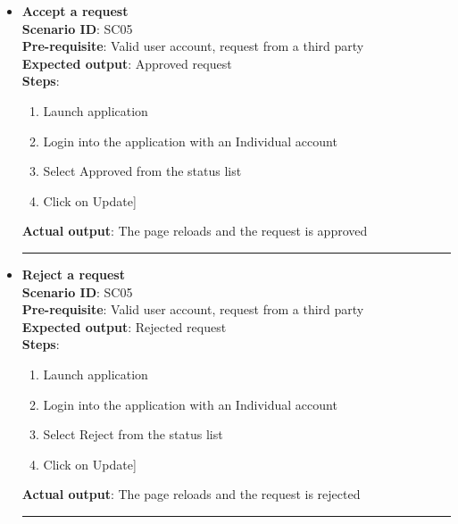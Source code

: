 \documentclass[a4paper, hidelinks, 12pt]{report}
\begin{document}
\begin{itemize}
		\item{\textbf{Accept a request}} \\
		\textbf{Scenario ID}: SC05 \\
		\textbf{Pre-requisite}: Valid user account,  request from a third party \\
		\textbf{Expected output}: Approved request\\
		\textbf{Steps}:
		\begin{enumerate}
			\item{Launch application}
			\item{Login into the application with an Individual account}
			\item{Select Approved from the status list}
			\item{Click on Update}]
		\end{enumerate}
		\textbf{Actual output}: The page reloads and the request is approved\\
		\rule{\linewidth}{0.4pt}

		\item{\textbf{Reject a request}} \\
		\textbf{Scenario ID}: SC05 \\
		\textbf{Pre-requisite}: Valid user account,  request from a third party \\
		\textbf{Expected output}: Rejected request\\
		\textbf{Steps}:
		\begin{enumerate}
			\item{Launch application}
			\item{Login into the application with an Individual account}
			\item{Select Reject from the status list}
			\item{Click on Update}]
		\end{enumerate}
		\textbf{Actual output}: The page reloads and the request is rejected\\
		\rule{\linewidth}{0.4pt}
\end{itemize}
\end{document}
